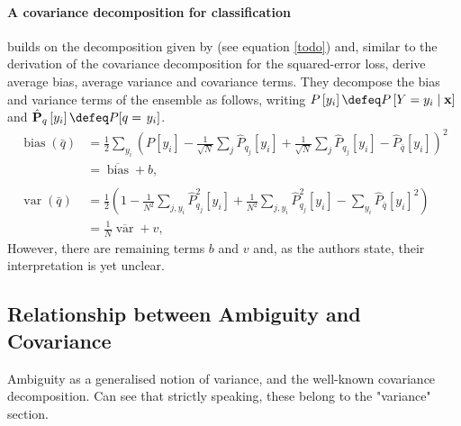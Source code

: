\documentclass[../main.tex]{subfiles}
\begin{document}
\paragraph{A covariance decomposition for classification}
\citeauthor{Didaci2013} builds on the decomposition given by \citeauthor{KohaviWolpert} (see equation \ref{todo}) and, similar to the derivation of the covariance decomposition for the squared-error loss, derive average bias, average variance and covariance terms.  They decompose the bias and variance terms of the ensemble as follows, writing $P\left[y_i\right]\defeq P\left[Y=y_i \mid \mathbf{x}\right]$ and $\hat{P}_{q}\left[y_i\right] \defeq P[q=\left.y_i\right]$. 
\begin{align*}
\operatorname{bias}(\bar{q}) & =\frac{1}{2} \sum_{y_i}\left(P\left[y_i\right]-\frac{1}{\sqrt{N}} \sum_j \hat{P}_{q_{j}}\left[y_i\right]+\frac{1}{\sqrt{N}} \sum_j \hat{P}_{q_{j}}\left[y_i\right]-\hat{P}_{\bar{q}}\left[y_i\right]\right)^2 \\
& =\overline{\operatorname{bias}}+b, \\ \\
\operatorname{var}(\bar{q}) & =\frac{1}{2}\left(1-\frac{1}{N^2} \sum_{j, y_i} \hat{P}_{q_{j}}^2\left[y_i\right]+\frac{1}{N^2} \sum_{j, y_i} \hat{P}_{q_{j}}^2\left[y_i\right]-\sum_{y_i} \hat{P}_{\bar{q}}\left[y_i\right]^2\right) \\
& =\frac{1}{N} \overline{\operatorname{var}}+v,
\end{align*}
However, there are remaining terms $b$ and $v$ and, as the authors state, their interpretation is yet unclear.


\subsection{Relationship between Ambiguity and Covariance}

Ambiguity as a generalised notion of variance, and the well-known covariance decomposition.  Can see that strictly speaking, these belong to the "variance" section.
\end{document}

